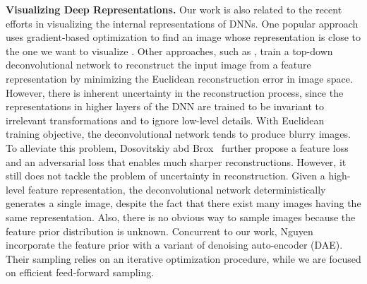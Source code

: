 \documentclass[10pt,twocolumn,letterpaper]{article}
\newcommand{\vpara}[1]{\vspace{0.1in}\noindent\textbf{#1}}
\begin{document}
\vpara{Visualizing Deep Representations.}
Our work is also related to the recent efforts in visualizing the internal representations of DNNs. One popular approach uses gradient-based optimization to find an image whose representation is close to the one we want to visualize \cite{mahendran2016visualizing}. 
Other approaches, such as \cite{dosovitskiy2016inverting}, train a top-down deconvolutional network to reconstruct the input image from a feature representation by minimizing the Euclidean reconstruction error in image space. However, there is inherent uncertainty in the reconstruction process, since the representations in higher layers of the DNN are trained to be invariant to irrelevant transformations and to ignore low-level details. With Euclidean training objective, the deconvolutional network tends to produce blurry images. 
To alleviate this problem, Dosovitskiy abd Brox~\cite{dosovitskiy2016generating} further propose a feature loss and an adversarial loss that enables much sharper reconstructions.  
However, it still does not tackle the problem of uncertainty in reconstruction. Given a high-level feature representation, the deconvolutional network deterministically generates a single image, despite the fact that there exist many images having the same representation. Also, there is no obvious way to sample images because the feature prior distribution is unknown. Concurrent to our work, Nguyen~\etal~\cite{nguyen2016plug} incorporate the feature prior with a variant of denoising auto-encoder (DAE). Their sampling relies on an iterative optimization procedure, while we are focused on efficient feed-forward sampling.
\end{document}
